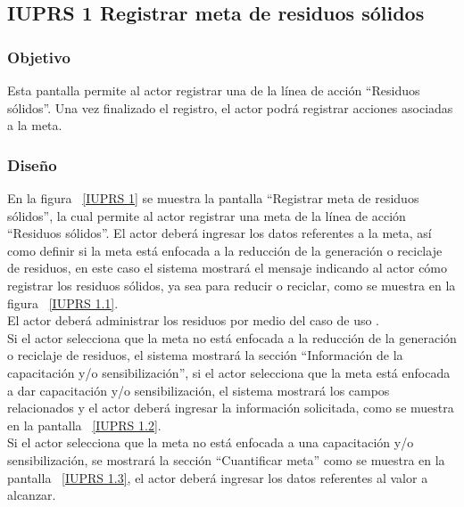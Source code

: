 \subsection{IUPRS 1 Registrar meta de residuos sólidos}
                     
\subsubsection{Objetivo}

   Esta pantalla permite al actor registrar una  de la línea de acción ``Residuos sólidos''. Una vez finalizado el registro, el actor podrá registrar acciones asociadas a la meta.

	
\subsubsection{Diseño}

  En la figura ~\ref{IUPRS 1} se muestra la pantalla ``Registrar meta de residuos sólidos'',
  la cual permite al actor registrar una meta de la línea de acción ``Residuos sólidos''. 
  El actor deberá ingresar los datos referentes a la meta, así como definir si la meta está enfocada a la reducción de la generación o reciclaje de residuos, en este caso el sistema mostrará el mensaje 
  indicando al actor cómo registrar los residuos sólidos, ya sea para reducir o reciclar, como se muestra en la figura ~\ref{IUPRS 1.1}.\\
  
  El actor deberá administrar los residuos por medio del caso de uso .\\
  
  Si el actor selecciona que la meta no está enfocada a la reducción de la generación o reciclaje de residuos, el sistema mostrará la sección ``Información de la capacitación y/o sensibilización'',
  si el actor selecciona que la meta está enfocada a dar capacitación y/o sensibilización, el sistema mostrará los campos relacionados y
  el actor deberá ingresar la información solicitada, como se muestra en la pantalla ~\ref{IUPRS 1.2}.\\
  
  Si el actor selecciona que la meta no está enfocada a una capacitación y/o sensibilización, se mostrará la sección ``Cuantificar meta'' como se muestra en la pantalla ~\ref{IUPRS 1.3}, el actor 
  deberá ingresar los datos referentes al valor a alcanzar.\\
 
